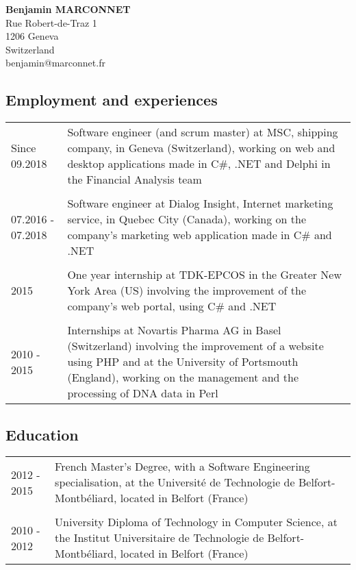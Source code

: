 \documentclass[11pt,a4paper]{article}
\begin{document}
\pagestyle{empty}

\newlength{\annee}
\settowidth{\annee}{abcdefghijklmnopqr}

\newlength{\texte}
\setlength{\texte}{\textwidth} \addtolength{\texte}{-\annee} 
	\addtolength{\texte}{-2\tabcolsep}

\noindent \textbf{{\large Benjamin MARCONNET}} \\
Rue Robert-de-Traz 1 \\
1206 Geneva \\
Switzerland \\
benjamin@marconnet.fr

\vspace{0.15cm}

\subsection*{Employment and experiences}
\noindent \begin{tabular}{@{}p{\annee}p{\texte}@{}}
Since 09.2018 & Software engineer (and scrum master) at MSC, shipping company, in Geneva (Switzerland), working on web and desktop applications made in C\#, .NET and Delphi in the Financial Analysis team  \\\\
07.2016 - 07.2018 & Software engineer at Dialog Insight, Internet marketing service, in Quebec City (Canada), working on the company's marketing web application made in C\# and .NET \\\\
2015 & One year internship at TDK-EPCOS in the Greater New York Area (US) \hbox{involving} the improvement of the company's web portal, using C\# and .NET \\\\
2010 - 2015 & Internships at Novartis Pharma AG in Basel (Switzerland) involving the improvement of a website using PHP and at the University of Portsmouth (England), working on the management and the processing of DNA data in Perl
\end{tabular}

\subsection*{Education}
\noindent \begin{tabular}{@{}p{\annee}p{\texte}@{}}
2012 - 2015 & French Master's Degree, with a Software \hbox{Engineering} \hbox{specialisation}, at the Université de Technologie de \hbox{Belfort-Montbéliard}, located in Belfort (France) \\ \\
2010 - 2012 & University Diploma of Technology in Computer Science, at the \hbox{Institut} Universitaire de Technologie de Belfort-Montbéliard, \hbox{located} in Belfort (France) 

\end{tabular}
\end{document}
